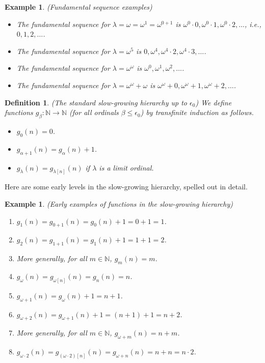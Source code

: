 \documentclass{article}
\newtheorem{definition}[theorem]{Definition}
\newtheorem{example}[theorem]{Example}
\begin{document}
\begin{example}
    (Fundamental sequence examples)
    \begin{itemize}
        \item
        The fundamental sequence for $\lambda=\omega=\omega^1=\omega^{0+1}$ is
        $\omega^0\cdot 0, \omega^0\cdot 1, \omega^0\cdot 2, \ldots$,
        i.e., $0, 1, 2, \ldots$.
        \item
        The fundamental sequence for $\lambda=\omega^5$ is
        $0,\omega^4,\omega^4\cdot 2,\omega^4\cdot 3,\ldots$.
        \item
        The fundamental sequence for $\lambda=\omega^\omega$ is
        $\omega^0,\omega^1,\omega^2,\ldots$.
        \item
        The fundamental sequence for $\lambda=\omega^\omega+\omega$ is
        $\omega^\omega+0,\omega^\omega+1,\omega^\omega+2,\ldots$.
    \end{itemize}
\end{example}

\begin{definition}
\label{slowgrowinghierarchydefn}
    (The standard slow-growing hierarchy up to $\epsilon_0$)
    We define functions $g_\beta:\mathbb N\to\mathbb N$ (for all ordinals
    $\beta\leq \epsilon_0$) by transfinite induction as follows.
    \begin{itemize}
        \item
        $g_0(n)=0$.
        \item
        $g_{\alpha+1}(n) = g_\alpha(n) + 1$.
        \item
        $g_{\lambda}(n) = g_{\lambda[n]}(n)$ if $\lambda$ is a limit ordinal.
    \end{itemize}
\end{definition}

Here are some early levels in the slow-growing hierarchy, spelled out in detail.

\begin{example}
\label{highdetailslowgrowingexample}
    (Early examples of functions in the slow-growing hierarchy)
    \begin{enumerate}
        \item
        $g_1(n)=g_{0+1}(n)=g_0(n)+1=0+1=1$.
        \item
        $g_2(n)=g_{1+1}(n)=g_1(n)+1=1+1=2$.
        \item
        More generally, for all $m\in\mathbb N$,
        $g_m(n)=m$.
        \item
        $g_\omega(n)=g_{\omega[n]}(n)=g_n(n)=n$.
        \item
        $g_{\omega+1}(n)=g_{\omega}(n)+1=n+1$.
        \item
        $g_{\omega+2}(n)=g_{\omega+1}(n)+1=(n+1)+1=n+2$.
        \item
        More generally, for all $m\in\mathbb N$,
        $g_{\omega+m}(n)=n+m$.
        \item
        $g_{\omega\cdot 2}(n)=g_{(\omega\cdot 2)[n]}(n)
        =g_{\omega+n}(n)=n+n=n\cdot 2$.
    \end{enumerate}
\end{example}
\end{document}
